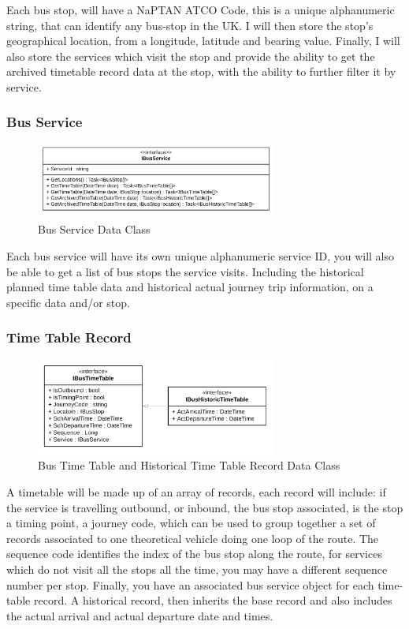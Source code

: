 \documentclass{article}
\begin{document}
Each bus stop, will have a NaPTAN ATCO Code, this is a unique alphanumeric string, that can identify any bus-stop in the UK. I will then store the stop's geographical location, from a longitude, latitude and bearing value. Finally, I will also store the services which visit the stop and provide the ability to get the archived timetable record data at the stop, with the ability to further filter it by service.  


\subsubsection{Bus Service}
\begin{figure}[H]
	\centering
	\includegraphics[width=300px]{images/CD_Service.png}
	\caption{Bus Service Data Class}
	\label{fig:busservicedata}
\end{figure}

Each bus service will have its own unique alphanumeric service ID, you will also be able to get a list of bus stops the service visits. Including the historical planned time table data and historical actual journey trip information, on a specific data and/or stop.


\subsubsection{Time Table Record}

\begin{figure}[H]
	\centering
	\includegraphics[width=300px]{images/CD_TimetableH.png}
	\caption{Bus Time Table and Historical Time Table Record Data Class}
	\label{fig:bustimetabledata}
\end{figure}

A timetable will be made up of an array of records, each record will include: if the service is travelling outbound, or inbound, the bus stop associated, is the stop a timing point, a journey code, which can be used to group together a set of records associated to one theoretical vehicle doing one loop of the route. The sequence code identifies the index of the bus stop along the route, for services which do not visit all the stops all the time, you may have a different sequence number per stop. Finally, you have an associated bus service object for each time-table record. A historical record, then inherits the base record and also includes the actual arrival and actual departure date and times. 
\end{document}
